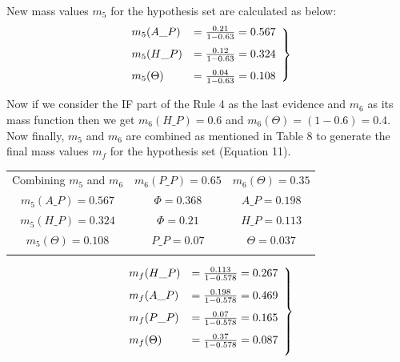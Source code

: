 \documentclass{ws-ijufks}
\begin{document}
New mass values $m_5$ for the hypothesis set are calculated as below:
\begin{equation}
\begin{aligned}
\left. \begin{array}{ll}
\vspace{0.25cm}
m_5 (A\_P)&=\frac{0.21}{1-0.63}=0.567\\
\vspace{0.25cm}
m_5(H\_P)&=\frac{0.12}{1-0.63}=0.324\\
m_5(\Theta)&=\frac{0.04}{1-0.63}=0.108
\end{array}\right\}
\end {aligned}
\end{equation} 

Now if we consider the IF part of the Rule 4 as the last evidence and $m_6$ as its mass function then we get 
$m_6(H\_P)=0.6$ and $m_6(\Theta)=(1-0.6)=0.4$. Now finally, $m_5$ and $m_6$ are combined as mentioned in Table 8 to 
generate the final mass values $m_f$ for the hypothesis set (Equation 11).

\begin{table}[h]
	\label{tab:MCF3}
	{\begin{tabular}{@{}ccc@{}} 
			\toprule
			Combining $m_5$ and $m_6$ & $m_6(P\_P)=0.65$ & $m_6(\Theta)=0.35$\\
			\colrule
			$m_5(A\_P)=0.567$ & $\Phi = 0.368$ & $A\_P=0.198$\\
		$m_5(H\_P)=0.324$ & $\Phi=0.21$ & $H\_P=0.113$\\
		$m_5(\Theta)=0.108$ & $P\_P=0.07$ & $\Theta=0.037$\\
			\botrule
		\end{tabular}}
	\end{table}
	
	
	\begin{equation}
	\begin{aligned}
	\left. \begin{array}{ll}
	\vspace{0.25cm}
	m_f (H\_P)&=\frac{0.113}{1-0.578}=0.267\\
	\vspace{0.25cm}
	m_f(A\_P)&=\frac{0.198}{1-0.578}=0.469\\
	\vspace{0.25cm}
	m_f(P\_P)&=\frac{0.07}{1-0.578}=0.165\\
	\vspace{0.25cm}
	m_f(\Theta)&=\frac{0.37}{1-0.578}=0.087
	\end{array}\right\}
	\end {aligned}
	\end{equation} 
	
\end{document}
